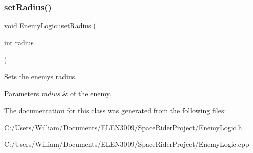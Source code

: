 \subsubsection{\texorpdfstring{set\+Radius()}{setRadius()}}
{\footnotesize\ttfamily void Enemy\+Logic\+::set\+Radius (\begin{DoxyParamCaption}\item[{int}]{radius }\end{DoxyParamCaption})}



Sets the enemy\textquotesingle{}s radius. 


\begin{DoxyParams}{Parameters}
{\em radius} & of the enemy. \\
\hline
\end{DoxyParams}


The documentation for this class was generated from the following files\+:\begin{DoxyCompactItemize}
\item 
C\+:/\+Users/\+William/\+Documents/\+E\+L\+E\+N3009/\+Space\+Rider\+Project/Enemy\+Logic.\+h\item 
C\+:/\+Users/\+William/\+Documents/\+E\+L\+E\+N3009/\+Space\+Rider\+Project/Enemy\+Logic.\+cpp\end{DoxyCompactItemize}
